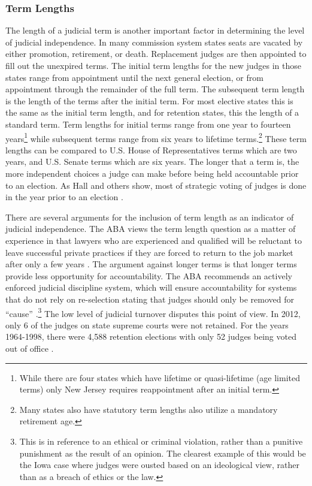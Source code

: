 \documentclass[12pt]{article}
\begin{document}
\subsubsection*{Term Lengths}
The length of a judicial term is another important factor in determining the level of judicial independence.  In many commission system states seats are vacated by either promotion, retirement, or death. Replacement judges are then appointed to fill out the unexpired terms. The initial term lengths for the new judges in those states range from appointment until the next general election, or from appointment through the remainder of the full term. The subsequent term length is the length of the terms after the initial term. For most elective states this is the same as the initial term length, and for retention states, this the length of a standard term. Term lengths for initial terms range from one year to fourteen years\footnote{While there are four states which have lifetime or quasi-lifetime (age limited terms) only New Jersey requires reappointment after an initial term.} while subsequent terms range from six years to lifetime terms.\footnote{Many states also have statutory term lengths also utilize a mandatory retirement age.}  These term lengths can be compared to U.S. House of Representatives terms which are two years, and U.S. Senate terms which are six years.  The longer that a term is, the more independent choices a judge can make before being held accountable prior to an election.  As Hall and others show, most of strategic voting of judges is done in the year prior to an election \citep{Hall1987,Hall1985,Brace2008,Canes-Wrone2012}.  

There are several arguments for the inclusion of term length as an indicator of judicial independence. The ABA views the term length question as a matter of experience in that lawyers who are experienced and qualified will be reluctant to leave successful private practices if they are forced to return to the job market after only a few years \citep{ABA2003}.   The argument against longer terms is that longer terms provide less opportunity for accountability. The ABA recommends an actively enforced judicial discipline system, which will ensure accountability for systems that do not rely on re-selection stating that judges should only be removed for ``cause'' \citep{ABA2003}.\footnote{This is in reference to an ethical or criminal violation, rather than a punitive punishment as the result of an opinion.  The clearest example of this would be the Iowa case where judges were ousted based on an ideological view, rather than as a breach of ethics or the law.}  The low level of judicial turnover disputes this point of view. In 2012, only 6 of the judges on state supreme courts were not retained. For the years 1964-1998, there were 4,588 retention elections with only 52 judges being voted out of office \citep{Aspin2000}.  
\end{document}
